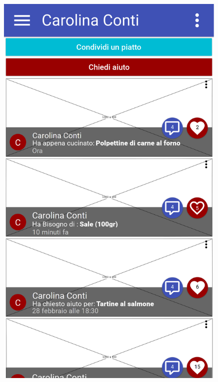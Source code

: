 \begin{figure}[H]
	\begin{minipage}{.49\textwidth}
		\includegraphics[width=\textwidth]{img/wireframe/profilo_social.png}
	\end{minipage}
	\begin{minipage}{.49\textwidth}

\end{minipage}
\end{figure}
